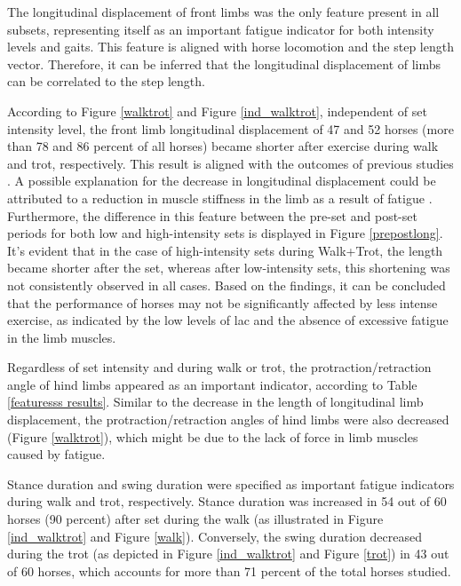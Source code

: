 The longitudinal displacement of front limbs was the only feature present in all subsets, representing itself as an important fatigue indicator for both intensity levels and gaits. This feature is aligned with horse locomotion and the step length vector. Therefore, it can be inferred that the longitudinal displacement of limbs can be correlated to the step length. 

According to Figure \ref{walktrot} and Figure \ref{ind_walktrot}, independent of \gls{set} intensity level, the front limb longitudinal displacement of 47 and 52 horses (more than 78 and 86 percent of all horses) became shorter after exercise during walk and trot, respectively. This result is aligned with the outcomes of previous studies \cite{Colborne2001ElectromyographicStudy.,Takahashi2021EffectsRaces}. A possible explanation for the decrease in longitudinal displacement could be attributed to a reduction in muscle stiffness in the limb as a result of fatigue \cite{wickler_2006_stride}. Furthermore, the difference in this feature between the pre-\gls{set} and post-\gls{set} periods for both low and high-intensity \gls{set}s is displayed in Figure \ref{prepostlong}. It's evident that in the case of high-intensity \gls{set}s during Walk+Trot, the length became shorter after the \gls{set}, whereas after low-intensity \gls{set}s, this shortening was not consistently observed in all cases. Based on the findings, it can be concluded that the performance of horses may not be significantly affected by less intense exercise, as indicated by the low levels of \gls{lac} and the absence of excessive fatigue in the limb muscles.


Regardless of \gls{set} intensity and during walk or trot, the protraction/retraction angle of hind limbs appeared as an important indicator, according to Table \ref{featuresss results}. Similar to the decrease in the length of longitudinal limb displacement, the protraction/retraction angles of hind limbs were also decreased (Figure \ref{walktrot}), which might be due to the lack of force in limb muscles caused by fatigue.

Stance duration and swing duration were specified as important fatigue indicators during walk and trot, respectively. Stance duration was increased in 54 out of 60 horses (90 percent) after \gls{set} during the walk (as illustrated in Figure \ref{ind_walktrot} and Figure \ref{walk}). Conversely, the swing duration decreased during the trot (as depicted in Figure \ref{ind_walktrot} and Figure \ref{trot}) in 43 out of 60 horses, which accounts for more than 71 percent of the total horses studied. 

